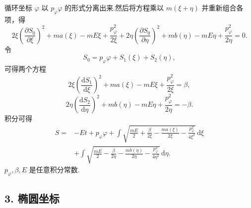 循环坐标 $\varphi$ 以 $p_\varphi\varphi$
的形式分离出来.然后将方程乘以 $m(\xi+\eta)$ 并重新组合各项，得
\begin{equation*}
  2\xi\left(\frac{\partial S_0}{\partial\xi}\right)^2+ma(\xi)-mE\xi
  +\frac{p_\varphi^2}{2\xi}
  +2\eta\left(\frac{\partial S_0}{\partial\eta}\right)^2+mb(\eta)-mE\eta
  +\frac{p_\varphi^2}{2\eta}=0.
\end{equation*}
令
\begin{equation*}
  S_0=p_\varphi\varphi+S_1(\xi)+S_2(\eta),
\end{equation*}
可得两个方程
\begin{equation*}
  2\xi\left(\frac{\mathrm{d}S_1}{\mathrm{d}\xi}\right)^2+ma(\xi)-mE\xi
  +\frac{p_\varphi^2}{2\xi}=\beta,
\end{equation*}
\begin{equation*}
  2\eta\left(\frac{\mathrm{d}S_2}{\mathrm{d}\eta}\right)^2+mb(\eta)-mE\eta
  +\frac{p_\varphi^2}{2\eta}=-\beta.
\end{equation*}
积分可得
\begin{equation}
\begin{aligned}
  S={}&-Et+p_\varphi\varphi
  +\int\sqrt{\frac{mE}{2}+\frac{\beta}{2\xi}-\frac{ma(\xi)}{2\xi}
  -\frac{p_\varphi^2}{4\xi^2}}\,\mathrm{d}\xi\\
  &+\int\sqrt{\frac{mE}{2}-\frac{\beta}{2\eta}-\frac{mb(\eta)}{2\eta}
  -\frac{p_\varphi^2}{4\eta^2}}\,\mathrm{d}\eta.
\end{aligned}
\end{equation}
$p_\varphi,\beta,E$ 是任意积分常数.

\subsection*{3. 椭圆坐标}

